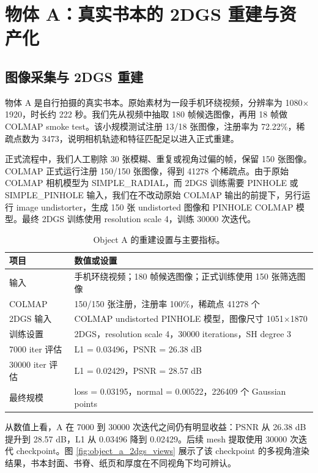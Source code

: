 \documentclass[UTF8,10pt,a4paper]{ctexart}
\begin{document}
\section{物体 A：真实书本的 2DGS 重建与资产化}

\subsection{图像采集与 2DGS 重建}

物体 A 是自行拍摄的真实书本。原始素材为一段手机环绕视频，分辨率为 1080$\times$1920，时长约 222 秒。我们先从视频中抽取 180 帧候选图像，再用 18 帧做 COLMAP smoke test。该小规模测试注册 13/18 张图像，注册率为 72.22\%，稀疏点数为 3473，说明相机轨迹和特征匹配足以进入正式重建。

正式流程中，我们人工剔除 30 张模糊、重复或视角过偏的帧，保留 150 张图像。COLMAP 正式运行注册 150/150 张图像，得到 41278 个稀疏点。由于原始 COLMAP 相机模型为 SIMPLE\_RADIAL，而 2DGS 训练需要 PINHOLE 或 SIMPLE\_PINHOLE 输入，我们在不改动原始 COLMAP 输出的前提下，另行运行 image undistorter，生成 150 张 undistorted 图像和 PINHOLE COLMAP 模型。最终 2DGS 训练使用 resolution scale 4，训练 30000 次迭代。

\begin{table}[H]
\centering
\caption{Object A 的重建设置与主要指标。}
\label{tab:object_a_recon_metrics}
\small
\begin{tabularx}{\textwidth}{p{} X}
\toprule
项目 & 数值或设置 \\
\midrule
输入 & 手机环绕视频；180 帧候选图像；正式训练使用 150 张筛选图像 \\
COLMAP & 150/150 张注册，注册率 100\%，稀疏点 41278 个 \\
2DGS 输入 & COLMAP undistorted PINHOLE 模型，图像尺寸 1051$\times$1870 \\
训练设置 & 2DGS，resolution scale 4，30000 iterations，SH degree 3 \\
7000 iter 评估 & L1 = 0.03496，PSNR = 26.38 dB \\
30000 iter 评估 & L1 = 0.02429，PSNR = 28.57 dB \\
最终规模 & loss = 0.03195，normal = 0.00522，226409 个 Gaussian points \\
\bottomrule
\end{tabularx}
\end{table}

从数值上看，A 在 7000 到 30000 次迭代之间仍有明显收益：PSNR 从 26.38 dB 提升到 28.57 dB，L1 从 0.03496 降到 0.02429。后续 mesh 提取使用 30000 次迭代 checkpoint。图 \ref{fig:object_a_2dgs_views} 展示了该 checkpoint 的多视角渲染结果，书本封面、书脊、纸页和厚度在不同视角下均可辨认。
\end{document}
